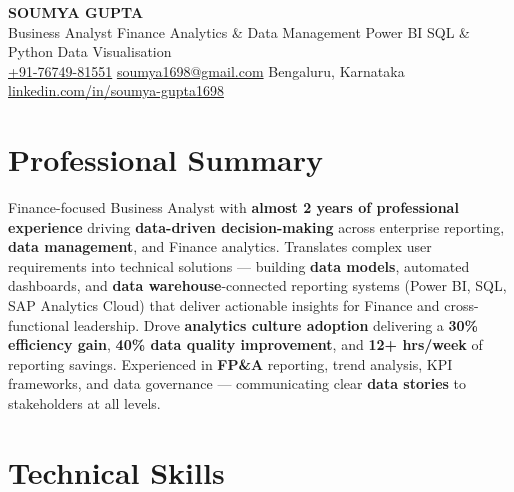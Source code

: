 \documentclass[10pt, letterpaper]{article}
\begin{document}

\begin{center}
  {\LARGE\bfseries SOUMYA GUPTA}\\[2pt]
  {\small\color{muted}Business Analyst \textbar{} Finance Analytics \& Data Management \textbar{} Power BI \textbar{} SQL \& Python \textbar{} Data Visualisation}\\[3pt]
  {\small
  \href{tel:+917674981551}{+91-76749-81551}\enspace\textbullet\enspace
  \href{mailto:soumya1698@gmail.com}{soumya1698@gmail.com}\enspace\textbullet\enspace
  Bengaluru, Karnataka\enspace\textbullet\enspace
  \href{https://linkedin.com/in/soumya-gupta1698}{linkedin.com/in/soumya-gupta1698}}
\end{center}

\vspace{-2pt}

\section{Professional Summary}

Finance-focused Business Analyst with \textbf{almost 2 years of professional experience} driving \textbf{data-driven decision-making} across enterprise reporting, \textbf{data management}, and Finance analytics. Translates complex user requirements into technical solutions — building \textbf{data models}, automated dashboards, and \textbf{data warehouse}-connected reporting systems (Power BI, SQL, SAP Analytics Cloud) that deliver actionable insights for Finance and cross-functional leadership. Drove \textbf{analytics culture adoption} delivering a \textbf{30\% efficiency gain}, \textbf{40\% data quality improvement}, and \textbf{12+ hrs/week} of reporting savings. Experienced in \textbf{FP\&A} reporting, trend analysis, KPI frameworks, and data governance — communicating clear \textbf{data stories} to stakeholders at all levels.

\section{Technical Skills}
\end{document}
